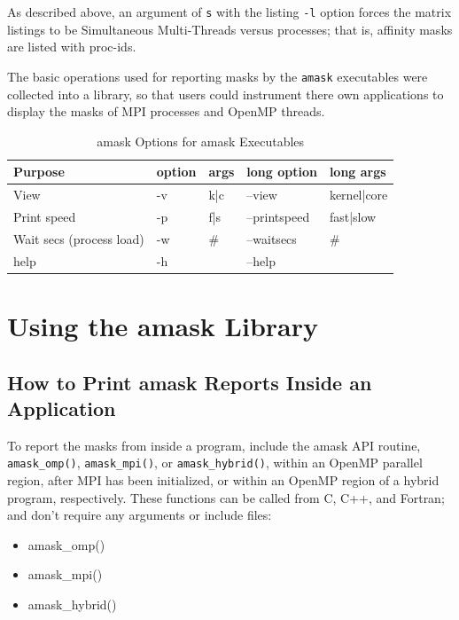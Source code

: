 \documentclass[10pt,a4paper]{report}
\begin{document}
As described above, an argument of \verb+s+ with the listing \verb+-l+ option forces the 
matrix listings to be Simultaneous Multi-Threads versus
processes; that is, affinity masks are listed with proc-ids. 


The basic operations used for reporting masks by the \verb+amask+ executables
were collected into a library, so that users
could instrument there own applications to display the masks of MPI processes
and OpenMP threads.

\begin{table}[ht]
\centering
\caption{amask Options for amask Executables}
\label{tab:amaskopts}
\begin{tabular}{|l|l|l|l|l|}
\hline
Purpose                  & option & args & long option  & long args   \\ \hline
View                     & -v     & k|c  & --view       & kernel|core \\ \hline
Print speed              & -p     & f|s  & --printspeed & fast|slow   \\ \hline
Wait secs (process load) & -w     & \#   & --waitsecs   & \#          \\ \hline
help                     & -h     &      & --help       &             \\ \hline
\end{tabular}
\end{table}


\chapter{Using the amask Library}


\section{How to Print amask Reports Inside an Application}

To report the masks from inside a program, include the amask API routine, \verb+amask_omp()+,
\verb+amask_mpi()+, or \verb+amask_hybrid()+, within an OpenMP parallel region, after MPI has been
initialized, or within an OpenMP region of a hybrid program, respectively.  These functions can
be called from C, C++, and Fortran; and don't require any arguments or include files:  

\begin{itemize}
\item amask\_omp()
\item amask\_mpi()
\item amask\_hybrid()
\end{itemize}
\end{document}
